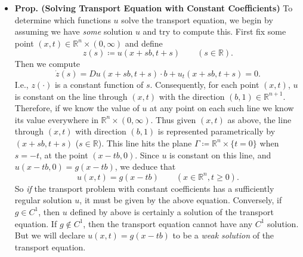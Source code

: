 \documentclass{article}
\begin{document}
\begin{itemize}
		\item \textbf{Prop. (Solving Transport Equation with Constant Coefficients)} To determine which functions $u$ solve the transport equation, we begin by assuming we have \textit{some} solution $u$ and try to compute this. First fix some point $(x, t) \in \mathbb{R}^{n} \times (0, \infty)$ and define 
		\begin{equation*}
			z(s) \coloneqq u(x + sb, t + s) \qquad (s \in \mathbb{R}). 
		\end{equation*}
		Then we compute 
		\begin{equation*}
			\dot{z}(s) = Du(x + sb, t + s) \cdot b + u_{t}(x + sb, t + s) = 0. 
		\end{equation*}
		I.e., $z(\cdot)$ is a constant function of $s$. Consequently, for each point $(x, t)$, $u$ is constant on the line through $(x, t)$ with the direction $(b, 1) \in \mathbb{R}^{n+1}$. Therefore, if we know the value of $u$ at any point on each such line we know its value everywhere in $\mathbb{R}^{n} \times (0,\infty)$. Thus given $(x, t)$ as above, the line through $(x, t)$ with direction $(b,1)$ is represented parametrically by $(x + sb, t + s)$ ($s\in\mathbb{R}$). This line hits the plane $\Gamma \coloneqq \mathbb{R}^{n} \times \{t = 0\}$ when $s = -t$, at the point $(x - tb, 0)$. Since $u$ is constant on this line, and $u(x-tb,0) = g(x - tb)$, we deduce that
		\begin{equation*}
			u(x, t)= g(x - tb) \qquad (x \in \mathbb{R}^{n}, t \geq 0). 
		\end{equation*}
		So \textit{if} the transport problem with constant coefficients has a sufficiently regular solution $u$, it must be given by the above equation. Conversely, if $g \in C^{1}$, then $u$ defined by above is certainly a solution of the transport equation. If $g \notin C^{1}$, then the transport equation cannot have any $C^{1}$ solution. But we will declare $u(x,t) = g(x - tb)$ to be a \textit{weak solution} of the transport equation. 
		

\end{itemize}
\end{document}
